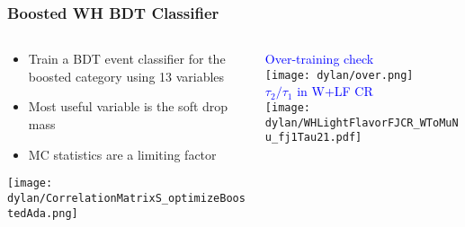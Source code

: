 \documentclass{beamer}
\begin{document}
\begin{frame}
  \frametitle{Boosted WH BDT Classifier}
  \begin{columns}
    \begin{column}{0.5\linewidth}
      \begin{itemize}
      \item Train a BDT event classifier for the boosted category using 13 variables
      \item Most useful variable is the soft drop mass
      \item MC statistics are a limiting factor
      \end{itemize}
      \centering
      \texttt{[image: dylan/CorrelationMatrixS\_optimizeBoostedAda.png]}
    \end{column}
    \begin{column}{0.5\linewidth}
      \centering
      \textcolor{blue}{Over-training check} \\
      \texttt{[image: dylan/over.png]} \\
      \textcolor{blue}{$\tau_2/\tau_1$ in W+LF CR} \\
      \texttt{[image: dylan/WHLightFlavorFJCR\_WToMuNu\_fj1Tau21.pdf]}
    \end{column}
  \end{columns}
\end{frame}
\end{document}
